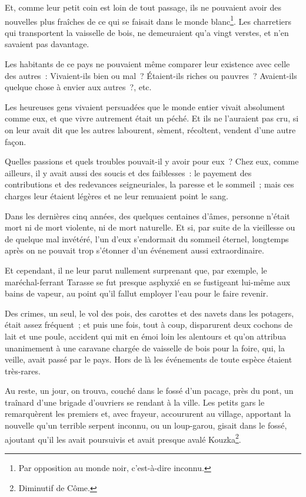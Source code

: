 \documentclass[french,twoside]{book} %
\begin{document}
Et, comme leur petit coin est loin de tout passage, ils ne pouvaient avoir des nouvelles plus fraîches de ce qui se faisait dans le monde blanc\footnote{Par opposition au monde noir, c’est-à-dire inconnu.}. Les charretiers qui transportent la vaisselle de bois, ne demeuraient qu’a vingt verstes, et n’en savaient pas davantage.\par
Les habitants de ce pays ne pouvaient même comparer leur existence avec celle des autres : Vivaient-ils bien ou mal ? Étaient-ils riches ou pauvres ? Avaient-ils quelque chose à envier aux autres ?, etc.\par
Les heureuses gens vivaient persuadées que le monde entier vivait absolument comme eux, et que vivre autrement était un péché. Et ils ne l’auraient pas cru, si on leur avait dit que les autres labourent, sèment, récoltent, vendent d’une autre façon.\par
Quelles passions et quels troubles pouvait-il y avoir pour eux ? Chez eux, comme ailleurs, il y avait aussi des soucis et des faiblesses : le payement des contributions et des redevances seigneuriales, la paresse et le sommeil ; mais ces charges leur étaient légères et ne leur remuaient point le sang.\par
Dans les dernières cinq années, des quelques centaines d’âmes, personne n’était mort ni de mort violente, ni de mort naturelle. Et si, par suite de la vieillesse ou de quelque mal invétéré, l’un d’eux s’endormait du sommeil éternel, longtemps après on ne pouvait trop s’étonner d’un événement aussi extraordinaire.\par
Et cependant, il ne leur parut nullement surprenant que, par exemple, le maréchal-ferrant Tarasse se fut presque asphyxié en se fustigeant lui-même aux bains de vapeur, au point qu’il fallut employer l’eau pour le faire revenir.\par
Des crimes, un seul, le vol des pois, des carottes et des navets dans les potagers, était assez fréquent ; et puis une fois, tout à coup, disparurent deux cochons de lait et une poule, accident qui mit en émoi loin les alentours et qu’on attribua unanimement à une caravane chargée de vaisselle de bois pour la foire, qui, la veille, avait passé par le pays. Hors de là les événements de toute espèce étaient très-rares.\par
Au reste, un jour, on trouva, couché dans le fossé d’un pacage, près du pont, un traînard d’une brigade d’ouvriers se rendant à la ville. Les petits gars le remarquèrent les premiers et, avec frayeur, accoururent au village, apportant la nouvelle qu’un terrible serpent inconnu, ou un loup-garou, gisait dans le fossé, ajoutant qu’il les avait poursuivis et avait presque avalé Kouzka\footnote{Diminutif de Côme.}.\par
\end{document}
